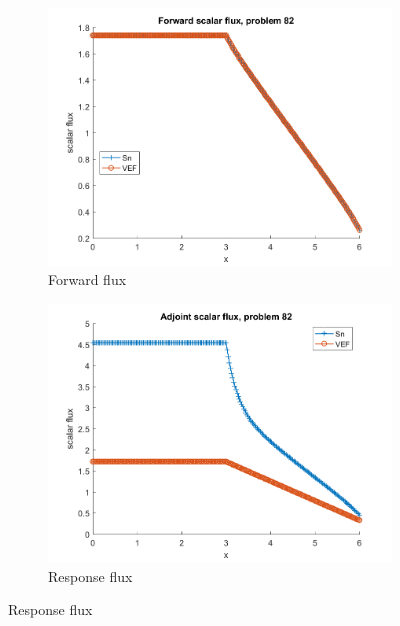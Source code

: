 \documentclass{article}
\begin{document}
\begin{figure}[H]
\label{Case82Flux}
\centering
\begin{subfigure}{.5\textwidth}
  \centering
  \includegraphics[width=.98\linewidth]{IanProposal/figures2/82phi.png}
  \caption{Forward flux}
  \label{fig:sfig1}
\end{subfigure}%
\begin{subfigure}{.5\textwidth}
  \centering
  \includegraphics[width=.98\linewidth]{IanProposal/figures2/82phia.png}
  \caption{Response flux}
  \label{fig:sfig4}
\end{subfigure}%
\end{figure}
\end{document}
